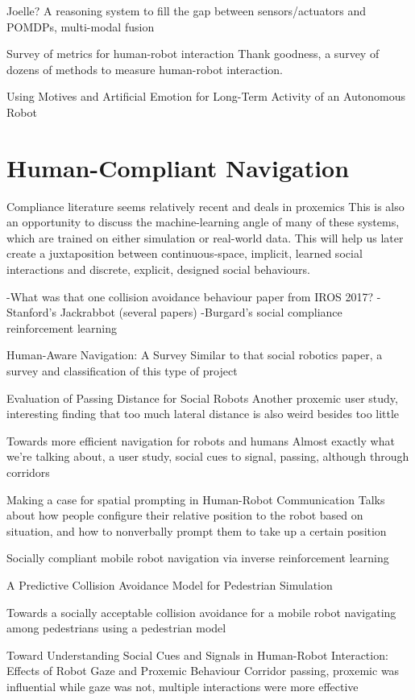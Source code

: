 \documentclass{sfuthesis}
\begin{document}
Joelle? A reasoning system to fill the gap between sensors/actuators and POMDPs, multi-modal fusion

Survey of metrics for human-robot interaction	Thank goodness, a survey of dozens of methods to measure human-robot interaction.

Using Motives and Artificial Emotion for Long-Term Activity of an Autonomous Robot


\section{Human-Compliant Navigation}

Compliance literature seems relatively recent and deals in proxemics This is also an opportunity to discuss the machine-learning angle of many of these systems, which are trained on either simulation or real-world data. This will help us later create a juxtaposition between continuous-space, implicit, learned social interactions and discrete, explicit, designed social behaviours.

-What was that one collision avoidance behaviour paper from IROS 2017?
-Stanford's Jackrabbot (several papers)
-Burgard's social compliance reinforcement learning

Human-Aware Navigation: A Survey	Similar to that social robotics paper, a survey and classification of this type of project

Evaluation of Passing Distance for Social Robots	Another proxemic user study, interesting finding that too much lateral distance is also weird besides too little	


Towards more efficient navigation for robots and humans	Almost exactly what we're talking about, a user study, social cues to signal, passing, although through corridors	

Making a case for spatial prompting in Human-Robot Communication	Talks about how people configure their relative position to the robot based on situation, and how to nonverbally prompt them to take up a certain position	

Socially compliant mobile robot navigation via inverse reinforcement learning

A Predictive Collision Avoidance Model for Pedestrian Simulation

Towards a socially acceptable collision avoidance for a mobile robot navigating among pedestrians using a pedestrian model

Toward Understanding Social Cues and Signals in Human-Robot Interaction: Effects of Robot Gaze and Proxemic Behaviour	Corridor passing, proxemic was influential while gaze was not, multiple interactions were more effective	
\end{document}
